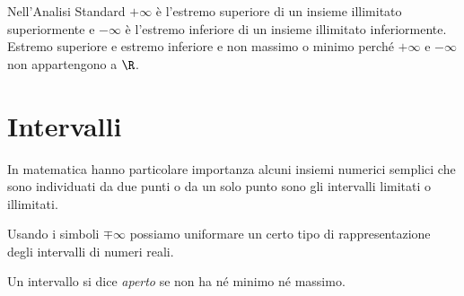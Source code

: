 \vspace{.5em}
Nell'Analisi Standard \(+\infty\) è l'estremo superiore di un insieme 
illimitato superiormente e \(-\infty\) è l'estremo inferiore di un insieme 
illimitato inferiormente.
Estremo superiore e estremo inferiore e non massimo o minimo perché 
\(+\infty\) e \(-\infty\) non appartengono a \(\R\).

\section{Intervalli}
\label{sec:topologiaintervalli}

% 
% 

In matematica hanno particolare importanza alcuni insiemi numerici semplici 
che sono individuati da due punti o da un solo punto sono gli intervalli 
limitati o illimitati.


Usando i simboli \(\mp \infty\) possiamo uniformare un certo tipo di 
rappresentazione degli intervalli di numeri reali.

\begin{newdef}{}{}
Un intervallo si dice \emph{aperto} se non ha né minimo né massimo.
\end{newdef}


